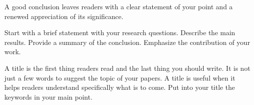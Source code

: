 A good conclusion leaves readers with a clear statement of your point and a renewed appreciation of its significance. 

Start with a brief statement with your research questions. Describe the main results. Provide a summary of the conclusion. Emphasize the contribution of your work. 

A title is the first thing readers read and the last thing you should write. It is not just a few words to suggest the topic of your papers. A title is useful when it helps readers understand specifically what is to come.  Put into your title the keywords in your main point. 